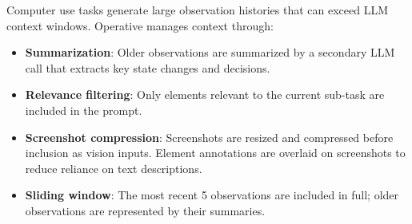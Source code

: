 Computer use tasks generate large observation histories that can exceed LLM context windows. Operative manages context through:

\begin{itemize}[leftmargin=*]
    \item \textbf{Summarization}: Older observations are summarized by a secondary LLM call that extracts key state changes and decisions.
    \item \textbf{Relevance filtering}: Only elements relevant to the current sub-task are included in the prompt.
    \item \textbf{Screenshot compression}: Screenshots are resized and compressed before inclusion as vision inputs. Element annotations are overlaid on screenshots to reduce reliance on text descriptions.
    \item \textbf{Sliding window}: The most recent 5 observations are included in full; older observations are represented by their summaries.
\end{itemize}

